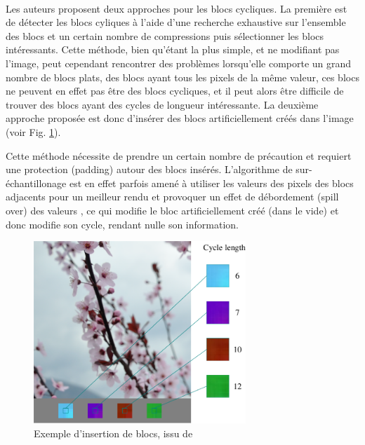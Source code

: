 \documentclass[utf8]{stageM2R} %
\begin{document}
\paragraph{}
Les auteurs proposent deux approches pour les blocs cycliques. La première est de détecter les blocs cyliques à l'aide d'une recherche exhaustive sur l'ensemble des blocs et un certain nombre de compressions puis sélectionner les blocs intéressants. Cette méthode, bien qu'étant la plus simple, et ne modifiant pas l'image, peut cependant rencontrer des problèmes lorsqu'elle comporte un grand nombre de blocs plats, des blocs ayant tous les pixels de la même valeur, ces blocs ne peuvent en effet pas être des blocs cycliques, et il peut alors être difficile de trouver des blocs ayant des cycles de longueur intéressante. La deuxième approche proposée est donc d'insérer des blocs artificiellement créés dans l'image (voir Fig. \ref{fig:insertion_blocs}). 

Cette méthode nécessite de prendre un certain nombre de précaution et requiert une protection (padding) autour des blocs insérés. L'algorithme de sur-échantillonage est en effet parfois amené à utiliser les valeurs des pixels des blocs adjacents pour un meilleur rendu et provoquer un effet de débordement (spill over) des valeurs \cite{carnein2015forensics}, ce qui modifie le bloc artificiellement créé (dans le vide) et donc modifie son cycle, rendant nulle son information.

\begin{figure}
  \begin{center}
    \includegraphics[width=80mm]{images/insertion_blocs}
    \caption{Exemple d'insertion de blocs, issu de \cite{CarneinSB2016TelltaleWatermarks}}
    \label{fig:insertion_blocs}
  \end{center}
\end{figure}
\end{document}
